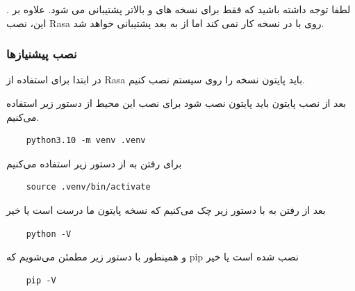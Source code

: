 . لطفا توجه داشته باشید که  فقط برای نسخه های  و بالاتر پشتیبانی می شود. علاوه بر این، نصب Rasa روی  با  در نسخه کار نمی کند اما از  به بعد پشتیبانی خواهد شد.

\subsubsection{نصب پیشنیاز‌ها}

در ابتدا برای استفاده از Rasa باید پایتون نسخه  را روی سیستم نصب کنیم.

بعد از نصب پایتون باید  پایتون نصب شود برای نصب این محیط از دستور زیر استفاده می‌کنیم.

\begin{latin}
    \begin{verbatim}
    python3.10 -m venv .venv
    \end{verbatim}
\end{latin}

برای رفتن به  از دستور زیر استفاده می‌کنیم

\begin{latin}
    \begin{verbatim}
    source .venv/bin/activate
    \end{verbatim}
\end{latin}

بعد از رفتن به  با دستور زیر چک می‌کنیم که نسخه پایتون ما درست است یا خیر

\begin{latin}
    \begin{verbatim}
    python -V
    \end{verbatim}
\end{latin}

و همینطور با دستور زیر مطمئن می‌شویم که pip نصب شده است یا خیر

\begin{latin}
    \begin{verbatim}
    pip -V
    \end{verbatim}
\end{latin}

